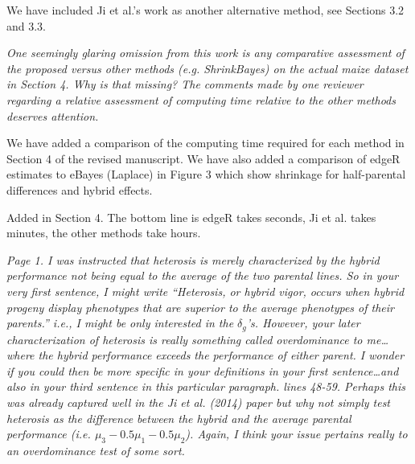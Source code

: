 \documentclass{article}
\newcommand{\comment}[1]{\textit{#1}}
\newcommand{\response}[1]{#1}
\begin{document}
\response{We have included Ji et al.'s work as another alternative method, see Sections 3.2 and 3.3.} 

\comment{One seemingly glaring omission from this work is any comparative assessment of the proposed versus other methods (e.g. ShrinkBayes) on the actual maize dataset in Section 4.  Why is that missing? The comments made by one reviewer regarding a relative assessment of computing time relative to the other methods deserves attention.}

\response{We have added a comparison of the computing time required for each method in Section 4 of the revised manuscript. We have also added a comparison of edgeR estimates to eBayes (Laplace) in Figure 3 which show shrinkage for half-parental differences and hybrid effects.}

\response{Added in Section 4. The bottom line is edgeR takes seconds, Ji et al. takes minutes, the other methods take hours.}

\comment{Page 1.  I was instructed that heterosis is merely characterized by the hybrid performance not being equal to the average of the two parental lines.  So in your very first sentence, I might write “Heterosis, or hybrid vigor, occurs when hybrid progeny display phenotypes that are superior to the average phenotypes of their parents.” i.e., I might be only interested in the $\delta_g$’s. However, your later characterization of heterosis is really something called overdominance to me…where the hybrid performance exceeds the performance of either parent.  I wonder if you could then be more specific in your definitions in your first sentence…and also in your third sentence in this particular paragraph. lines 48-59.  Perhaps this was already captured well in the Ji et al. (2014) paper but why not simply test heterosis as the difference between the hybrid and the average parental performance (i.e. $\mu_3 - 0.5 \mu_1 - 0.5 \mu_2$).  Again, I think your issue pertains really to an overdominance test of some sort.}
\end{document}
